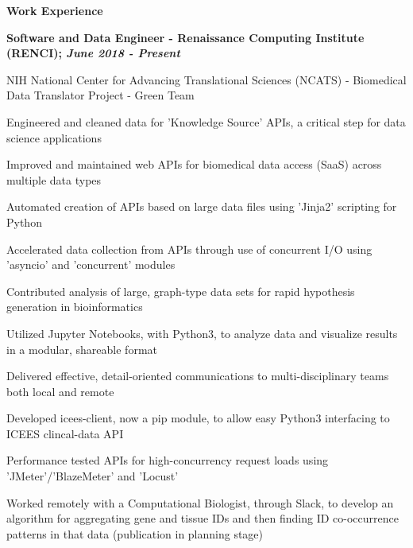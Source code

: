 \documentclass[letterpaper,final]{memoir}
\newcommand{\Sep}{\vspace{1.0em}}
\newcommand{\SmallSep}{\vspace{0.4em}}
\newcommand{\CVSection}[1]
	{\LARGE\textbf{#1}\par
	\SmallSep\normalsize}
\newcommand{\CVItem}[1]
	{\textbf{\color{Blue} #1}}
\begin{document}

\notoserif \CVSection{Work Experience}
\normalfont

\Sep

\CVItem{Software and Data Engineer - Renaissance Computing Institute (RENCI); \textit{June 2018 - Present}}
\begin{compactitem}[\color{Blue}$\circ$]
    
    \SmallSep
    \item NIH National Center for Advancing Translational Sciences (NCATS) - Biomedical Data Translator Project - Green Team
    \SmallSep
    \item Engineered and cleaned data for 'Knowledge Source' APIs, a critical step for data science applications
    \SmallSep  
    \item Improved and maintained web APIs for biomedical data access (SaaS) across multiple data types
    \SmallSep
    \item Automated creation of APIs based on large data files using 'Jinja2' scripting for Python
    \SmallSep
    \item Accelerated data collection from APIs through use of concurrent I/O using 'asyncio' and 'concurrent' modules
    \SmallSep
    \item Contributed analysis of large, graph-type data sets for rapid hypothesis generation in bioinformatics
    \SmallSep
    \item Utilized Jupyter Notebooks, with Python3, to analyze data and visualize results in a modular, shareable format
    \SmallSep
    \item Delivered effective, detail-oriented communications to multi-disciplinary teams both local and remote
    \SmallSep
    \item Developed icees-client, now a pip module, to allow easy Python3 interfacing to ICEES clincal-data API
    \SmallSep
    \item Performance tested APIs for high-concurrency request loads using 'JMeter'/'BlazeMeter' and 'Locust'
    \SmallSep
    \item Worked remotely with a Computational Biologist, through Slack, to develop an algorithm for 
    aggregating gene and tissue IDs and then finding ID co-occurrence patterns in that data (publication in planning stage)

\end{compactitem}

\Sep
\end{document}
